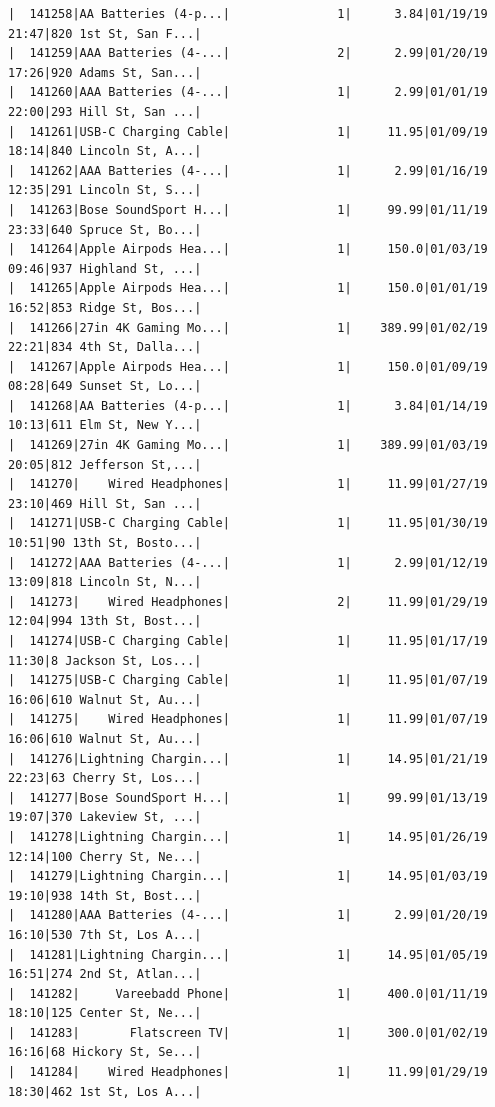 \documentclass[
  letterpaper,
  DIV=11,
  numbers=noendperiod]{scrartcl}
\begin{document}
\begin{verbatim}
|  141258|AA Batteries (4-p...|               1|      3.84|01/19/19 21:47|820 1st St, San F...|
|  141259|AAA Batteries (4-...|               2|      2.99|01/20/19 17:26|920 Adams St, San...|
|  141260|AAA Batteries (4-...|               1|      2.99|01/01/19 22:00|293 Hill St, San ...|
|  141261|USB-C Charging Cable|               1|     11.95|01/09/19 18:14|840 Lincoln St, A...|
|  141262|AAA Batteries (4-...|               1|      2.99|01/16/19 12:35|291 Lincoln St, S...|
|  141263|Bose SoundSport H...|               1|     99.99|01/11/19 23:33|640 Spruce St, Bo...|
|  141264|Apple Airpods Hea...|               1|     150.0|01/03/19 09:46|937 Highland St, ...|
|  141265|Apple Airpods Hea...|               1|     150.0|01/01/19 16:52|853 Ridge St, Bos...|
|  141266|27in 4K Gaming Mo...|               1|    389.99|01/02/19 22:21|834 4th St, Dalla...|
|  141267|Apple Airpods Hea...|               1|     150.0|01/09/19 08:28|649 Sunset St, Lo...|
|  141268|AA Batteries (4-p...|               1|      3.84|01/14/19 10:13|611 Elm St, New Y...|
|  141269|27in 4K Gaming Mo...|               1|    389.99|01/03/19 20:05|812 Jefferson St,...|
|  141270|    Wired Headphones|               1|     11.99|01/27/19 23:10|469 Hill St, San ...|
|  141271|USB-C Charging Cable|               1|     11.95|01/30/19 10:51|90 13th St, Bosto...|
|  141272|AAA Batteries (4-...|               1|      2.99|01/12/19 13:09|818 Lincoln St, N...|
|  141273|    Wired Headphones|               2|     11.99|01/29/19 12:04|994 13th St, Bost...|
|  141274|USB-C Charging Cable|               1|     11.95|01/17/19 11:30|8 Jackson St, Los...|
|  141275|USB-C Charging Cable|               1|     11.95|01/07/19 16:06|610 Walnut St, Au...|
|  141275|    Wired Headphones|               1|     11.99|01/07/19 16:06|610 Walnut St, Au...|
|  141276|Lightning Chargin...|               1|     14.95|01/21/19 22:23|63 Cherry St, Los...|
|  141277|Bose SoundSport H...|               1|     99.99|01/13/19 19:07|370 Lakeview St, ...|
|  141278|Lightning Chargin...|               1|     14.95|01/26/19 12:14|100 Cherry St, Ne...|
|  141279|Lightning Chargin...|               1|     14.95|01/03/19 19:10|938 14th St, Bost...|
|  141280|AAA Batteries (4-...|               1|      2.99|01/20/19 16:10|530 7th St, Los A...|
|  141281|Lightning Chargin...|               1|     14.95|01/05/19 16:51|274 2nd St, Atlan...|
|  141282|     Vareebadd Phone|               1|     400.0|01/11/19 18:10|125 Center St, Ne...|
|  141283|       Flatscreen TV|               1|     300.0|01/02/19 16:16|68 Hickory St, Se...|
|  141284|    Wired Headphones|               1|     11.99|01/29/19 18:30|462 1st St, Los A...|

\end{verbatim}
\end{document}
